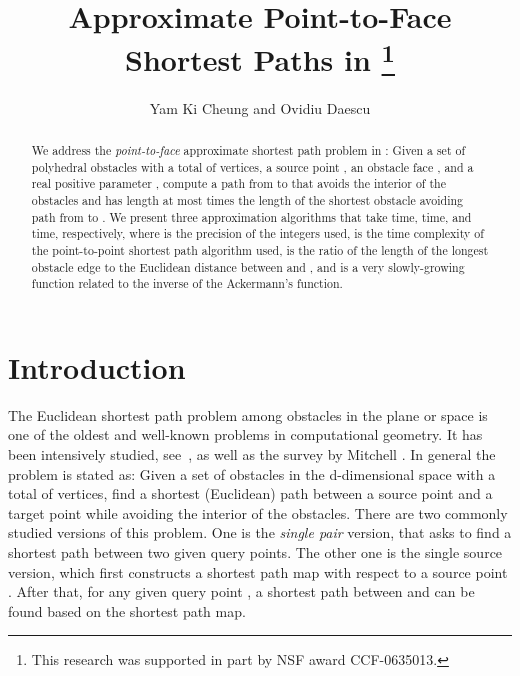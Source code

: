 \documentclass{llncs}
\title{Approximate Point-to-Face Shortest Paths in \thanks{This
research was supported in part by NSF award CCF-0635013.}}
\author{Yam Ki Cheung and Ovidiu Daescu}
\institute{Department of Computer Science \\
       University of Texas at Dallas \\
       Richardson, TX 75080, USA \\
       {\tt \{ykcheung,daescu\}@utdallas.edu}}
\begin{document}
\pagestyle{empty}
\maketitle

\begin{abstract}
We address the {\em point-to-face} approximate shortest path problem in :
Given a set of polyhedral obstacles with a total of  vertices, a source point ,
an obstacle face , and a real positive parameter , compute a path from  to 
that avoids the interior of the obstacles and has length at most  times the length
of the shortest obstacle avoiding path from  to .
We present three approximation algorithms that take
 time,
 time, and
 time,
respectively, where  is the precision of the integers used,  is the time
complexity of the point-to-point shortest path algorithm used,  is the ratio of the length
of the longest obstacle edge to the
Euclidean distance between  and , and  is a very slowly-growing function related to
the inverse of the Ackermann's function.
\end{abstract}

\section{Introduction}

The Euclidean shortest path problem among obstacles in the plane or space is one of the oldest and
 well-known problems in computational geometry. It has been intensively studied,
see~\cite{agarwal,chen,Clar87,har-peled,Her99,KMM97, Sar99,Pap85,sharir,Sharir86,GM87,KM88,OW88,Mit96,Mount84, Mit87},
as well as the survey by Mitchell \cite{Mit00}.
In general the problem is stated as: Given a set of obstacles in the d-dimensional
space  with a total of  vertices, find a shortest (Euclidean) path between a source
point  and a target point  while avoiding the interior of the obstacles. There are two
commonly studied versions of this problem. One is the {\em single pair} version, that asks to find a
shortest path between two given query points. The other one is the
single source version, which first constructs a shortest path map with respect to a source
point . After that, for any given query point , a shortest path between  and  can be
found based on the shortest path map.
\end{document}
